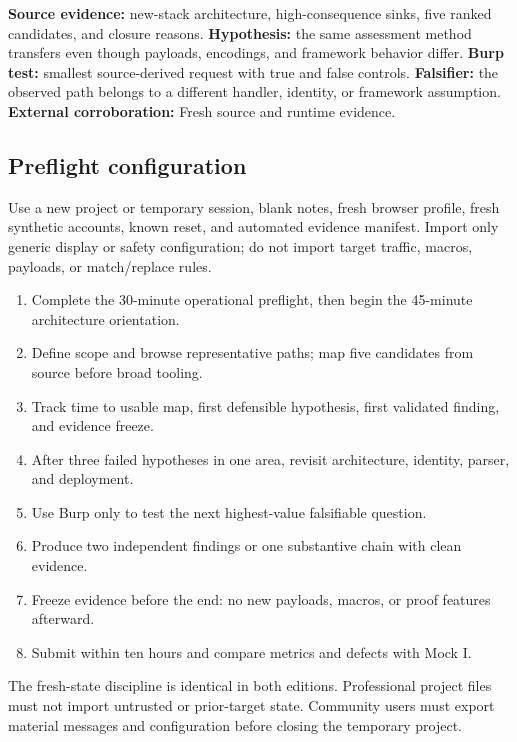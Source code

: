 \documentclass[11pt]{article}
\newcommand{\weekfield}[2]{%
  \Needspace{5\baselineskip}
  \subsection*{#1}
  #2
}
\newcommand{\externalproof}[1]{\textbf{External corroboration:} #1}
\begin{document}
\begin{bridgebox}
\textbf{Source evidence:} new-stack architecture, high-consequence sinks, five
ranked candidates, and closure reasons. \textbf{Hypothesis:} the same assessment
method transfers even though payloads, encodings, and framework behavior differ.
\textbf{Burp test:} smallest source-derived request with true and false controls.
\textbf{Falsifier:} the observed path belongs to a different handler, identity,
or framework assumption. \externalproof{Fresh source and runtime evidence.}
\end{bridgebox}

\weekfield{Preflight configuration}{Use a new project or temporary session,
blank notes, fresh browser profile, fresh synthetic accounts, known reset, and
automated evidence manifest. Import only generic display or safety configuration;
do not import target traffic, macros, payloads, or match/replace rules.}

\begin{procedurebox}
\begin{enumerate}
  \item Complete the 30-minute operational preflight, then begin the 45-minute architecture orientation.
  \item Define scope and browse representative paths; map five candidates from source before broad tooling.
  \item Track time to usable map, first defensible hypothesis, first validated finding, and evidence freeze.
  \item After three failed hypotheses in one area, revisit architecture, identity, parser, and deployment.
  \item Use Burp only to test the next highest-value falsifiable question.
  \item Produce two independent findings or one substantive chain with clean evidence.
  \item Freeze evidence before the end: no new payloads, macros, or proof features afterward.
  \item Submit within ten hours and compare metrics and defects with Mock I.
\end{enumerate}
\end{procedurebox}

\begin{editionbox}
The fresh-state discipline is identical in both editions. Professional project
files must not import untrusted or prior-target state. Community users must export
material messages and configuration before closing the temporary project.
\end{editionbox}
\end{document}
